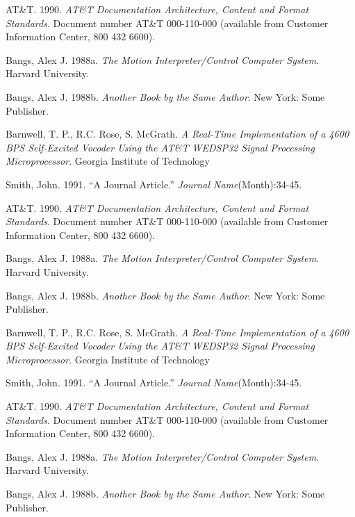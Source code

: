 \begin{thebibliography}{99}

AT\&T. 1990. {\it AT\&T Documentation Architecture, Content and Format
Standards}.  Document number AT\&T 000-110-000 (available from
Customer Information Center, 800 432 6600).

Bangs, Alex J. 1988a. {\it The Motion Interpreter/Control Computer
System}. Harvard University.


Bangs, Alex J. 1988b. {\it Another Book by the Same Author}. New York:
Some Publisher.


Barnwell, T. P., R.C. Rose, S. McGrath. {\it A Real-Time
Implementation of a 4600 BPS Self-Excited Vocoder Using the AT\&T
WE\regmark DSP32 Signal Processing Microprocessor}.  Georgia Institute
of Technology


Smith, John. 1991. ``A Journal Article.'' {\it Journal Name}(Month):34-45.

AT\&T. 1990. {\it AT\&T Documentation Architecture, Content and Format
Standards}.  Document number AT\&T 000-110-000 (available from
Customer Information Center, 800 432 6600).

Bangs, Alex J. 1988a. {\it The Motion Interpreter/Control Computer
System}. Harvard University.


Bangs, Alex J. 1988b. {\it Another Book by the Same Author}. New York:
Some Publisher.


Barnwell, T. P., R.C. Rose, S. McGrath. {\it A Real-Time
Implementation of a 4600 BPS Self-Excited Vocoder Using the AT\&T
WE\regmark DSP32 Signal Processing Microprocessor}.  Georgia Institute
of Technology


Smith, John. 1991. ``A Journal Article.'' {\it Journal Name}(Month):34-45.

AT\&T. 1990. {\it AT\&T Documentation Architecture, Content and Format
Standards}.  Document number AT\&T 000-110-000 (available from
Customer Information Center, 800 432 6600).

Bangs, Alex J. 1988a. {\it The Motion Interpreter/Control Computer
System}. Harvard University.


Bangs, Alex J. 1988b. {\it Another Book by the Same Author}. New York:
Some Publisher.



\end{thebibliography}
